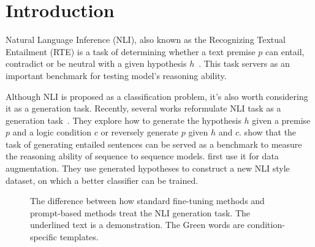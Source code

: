 \section{Introduction}
Natural Language Inference (NLI), also known as the Recognizing Textual 
Entailment (RTE) is a task of determining whether a text premise $p$ 
can entail, contradict or be neutral with a given hypothesis $h$~\citep{DBLP:conf/mlcw/DaganGM05}. 
This task servers as an important benchmark for testing model's reasoning 
ability.

Although NLI is proposed as a classification problem, 
it's also worth considering it as a generation task. Recently, 
several works reformulate NLI task as a generation task~\citep{DBLP:journals/corr/KolesnykRR16,DBLP:journals/csl/StarcM17,DBLP:journals/corr/abs-1803-02710,DBLP:journals/corr/abs-1909-09788}. 
They explore how to generate the hypothesis $h$ given 
a premise $p$ and a logic condition $c$ or reversely generate $p$ given $h$ and $c$. 
\citet{DBLP:journals/corr/KolesnykRR16} show that the task of generating 
entailed sentences can be served as a benchmark to measure the reasoning 
ability of sequence to sequence models.
\citet{DBLP:journals/csl/StarcM17} first use it for data augmentation. They use generated hypotheses to construct a new NLI style dataset, on which a better classifier can 
be trained.

\begin{figure}[t]
	\centering
	\caption{The difference between how standard fine-tuning methods and prompt-based methods treat the NLI generation task. The underlined text is a demonstration. The Green words are condition-specific templates.} \label{fig:intro_prompt}
\end{figure}

